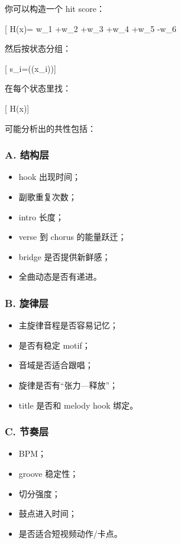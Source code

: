 \documentclass[
  12pt,
]{ctexart}
\providecommand{\tightlist}{%
  \setlength{\itemsep}{0pt}\setlength{\parskip}{0pt}}
\begin{document}
你可以构造一个 hit score：

{[} H(x)= w\_1 +w\_2 +w\_3
+w\_4 +w\_5
-w\_6\text{skip rate}{]}

然后按状态分组：

{[} s\_i=(\phi(x\_i)){]}

在每个状态里找：

{[}  H(x){]}

可能分析出的共性包括：

\subsubsection{A. 结构层}\label{a.-ux7ed3ux6784ux5c42}

\begin{itemize}
\tightlist
\item
  hook 出现时间；
\item
  副歌重复次数；
\item
  intro 长度；
\item
  verse 到 chorus 的能量跃迁；
\item
  bridge 是否提供新鲜感；
\item
  全曲动态是否有递进。
\end{itemize}

\subsubsection{B. 旋律层}\label{b.-ux65cbux5f8bux5c42}

\begin{itemize}
\tightlist
\item
  主旋律音程是否容易记忆；
\item
  是否有稳定 motif；
\item
  音域是否适合跟唱；
\item
  旋律是否有``张力---释放''；
\item
  title 是否和 melody hook 绑定。
\end{itemize}

\subsubsection{C. 节奏层}\label{c.-ux8282ux594fux5c42}

\begin{itemize}
\tightlist
\item
  BPM；
\item
  groove 稳定性；
\item
  切分强度；
\item
  鼓点进入时间；
\item
  是否适合短视频动作/卡点。
\end{itemize}
\end{document}

